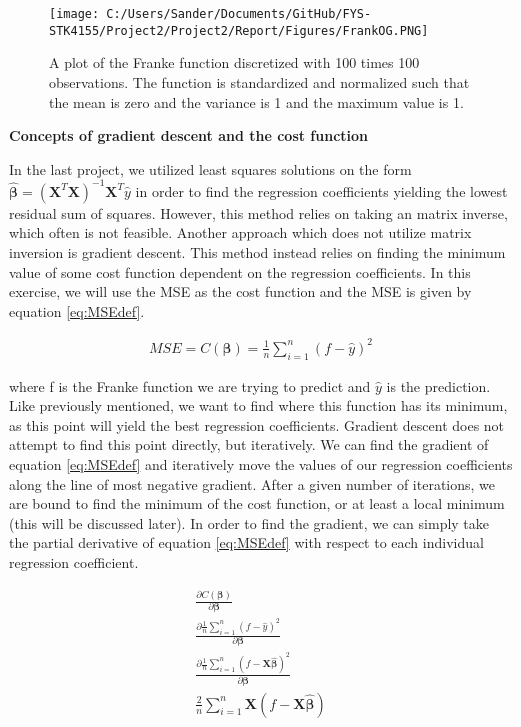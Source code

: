 \documentclass[12pt,a4paper]{article}
\begin{document}
\begin{figure}[H]
\centering
\texttt{[image: C:/Users/Sander/Documents/GitHub/FYS-STK4155/Project2/Project2/Report/Figures/FrankOG.PNG]}
\caption{\label{fig:Franke} A plot of the Franke function discretized with 100 times 100 observations. The function is standardized and normalized such that the mean is zero and the variance is 1 and the maximum value is 1.}
\end{figure}

\begin{center}
\large{\textbf{Concepts of gradient descent and the cost function}}
\end{center}

\noindent In the last project, we utilized least squares solutions on the form $\boldsymbol{\hat{\beta}} = (\textbf{X}^T\textbf{X})^{-1}\textbf{X}^T\hat{y}$ in order to find the regression coefficients yielding the lowest residual sum of squares. However, this method relies on taking an matrix inverse, which often is not feasible. Another approach which does not utilize matrix inversion is gradient descent. This method instead relies on finding the minimum value of some cost function dependent on the regression coefficients. In this exercise, we will use the MSE as the cost function and the MSE is given by equation \ref{eq:MSEdef}.

\begin{equation}\label{eq:MSEdef}
\begin{aligned}
MSE = C(\boldsymbol{\beta}) = \frac{1}{n}\sum_{i = 1}^n (f - \hat{y})^2
\end{aligned}
\end{equation}

\noindent where f is the Franke function we are trying to predict and $\hat{y}$ is the prediction. Like previously mentioned, we want to find where this function has its minimum, as this point will yield the best regression coefficients. Gradient descent does not attempt to find this point directly, but iteratively. We can find the gradient of equation \ref{eq:MSEdef} and iteratively move the values of our regression coefficients along the line of most negative gradient. After a given number of iterations, we are bound to find the minimum of the cost function, or at least a local minimum (this will be discussed later). In order to find the gradient, we can simply take the partial derivative of equation \ref{eq:MSEdef} with respect to each individual regression coefficient.

\begin{equation}\label{eq:MSEder}
\begin{aligned}
\frac{\partial C(\boldsymbol{\beta})}{\partial \boldsymbol{\beta}} 
\\
\frac{\partial \frac{1}{n} \sum_{i = 1}^n (f-\hat{y})^2}{\partial \boldsymbol{\beta}} 
\\
\frac{\partial \frac{1}{n} \sum_{i = 1}^n (f-\textbf{X}\boldsymbol{\hat{\beta}})^2}{\partial \boldsymbol{\beta}} 
\\
\frac{2}{n} \sum_{i = 1}^n \textbf{X}(f - \textbf{X}\boldsymbol{\hat{\beta}}) 
\end{aligned}
\end{equation}
\end{document}
